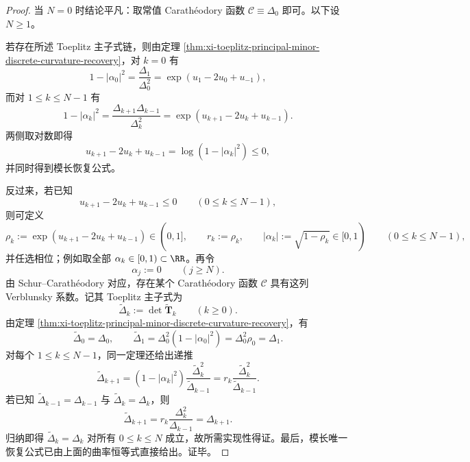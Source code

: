 \begin{proof}
当 \(N=0\) 时结论平凡：取常值 Carath\'eodory 函数 \(\mathscr C\equiv \Delta_0\) 即可。以下设 \(N\ge 1\)。

若存在所述 Toeplitz 主子式链，则由定理 \ref{thm:xi-toeplitz-principal-minor-discrete-curvature-recovery}，对 \(k=0\) 有
\[
1-|\alpha_0|^2
=
\frac{\Delta_1}{\Delta_0^2}
=
\exp(u_1-2u_0+u_{-1}),
\]
而对 \(1\le k\le N-1\) 有
\[
1-|\alpha_k|^2
=
\frac{\Delta_{k+1}\Delta_{k-1}}{\Delta_k^2}
=
\exp(u_{k+1}-2u_k+u_{k-1}).
\]
两侧取对数即得
\[
u_{k+1}-2u_k+u_{k-1}
=
\log(1-|\alpha_k|^2)\le 0,
\]
并同时得到模长恢复公式。

反过来，若已知
\[
u_{k+1}-2u_k+u_{k-1}\le 0
\qquad(0\le k\le N-1),
\]
则可定义
\[
\rho_k:=\exp(u_{k+1}-2u_k+u_{k-1})\in(0,1],
\qquad
r_k:=\rho_k,
\qquad
|\alpha_k|:=\sqrt{1-\rho_k}\in[0,1)
\qquad(0\le k\le N-1),
\]
并任选相位；例如取全部 \(\alpha_k\in[0,1)\subset\RR\)。再令
\[
\alpha_j:=0
\qquad(j\ge N).
\]
由 Schur--Carath\'eodory 对应，存在某个 Carath\'eodory 函数 \(\mathscr C\) 具有这列 Verblunsky 系数。记其 Toeplitz 主子式为
\[
\widetilde\Delta_k:=\det \widetilde{\mathbf T}_k
\qquad(k\ge 0).
\]
由定理 \ref{thm:xi-toeplitz-principal-minor-discrete-curvature-recovery}，有
\[
\widetilde\Delta_0=\Delta_0,
\qquad
\widetilde\Delta_1
=
\Delta_0^2(1-|\alpha_0|^2)
=
\Delta_0^2\rho_0
=
\Delta_1.
\]
对每个 \(1\le k\le N-1\)，同一定理还给出递推
\[
\widetilde\Delta_{k+1}
=(1-|\alpha_k|^2)\frac{\widetilde\Delta_k^2}{\widetilde\Delta_{k-1}}
=r_k\frac{\widetilde\Delta_k^2}{\widetilde\Delta_{k-1}}.
\]
若已知 \(\widetilde\Delta_{k-1}=\Delta_{k-1}\) 与 \(\widetilde\Delta_k=\Delta_k\)，则
\[
\widetilde\Delta_{k+1}
=r_k\frac{\Delta_k^2}{\Delta_{k-1}}
=\Delta_{k+1}.
\]
归纳即得 \(\widetilde\Delta_k=\Delta_k\) 对所有 \(0\le k\le N\) 成立，故所需实现性得证。最后，模长唯一恢复公式已由上面的曲率恒等式直接给出。证毕。
\end{proof}

